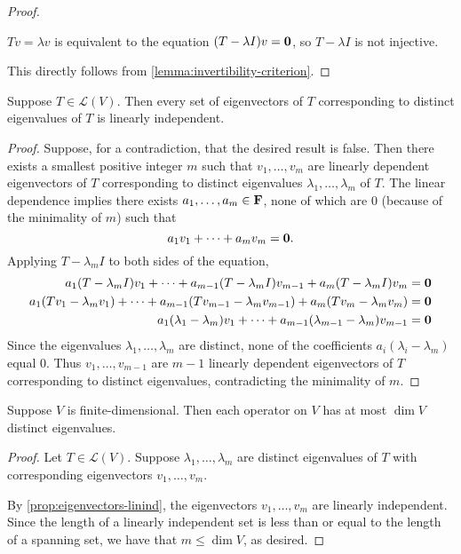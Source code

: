 \begin{proof} \

 $Tv=\lambda v$ is equivalent to the equation $(T-\lambda I)v=\vb{0}$, so $T-\lambda I$ is not injective.

 This directly follows from \ref{lemma:invertibility-criterion}.
\end{proof}

\begin{proposition}\label{prop:eigenvectors-linind}
Suppose $T\in\mathcal{L}(V)$. Then every set of eigenvectors of $T$ corresponding to distinct eigenvalues of $T$ is linearly independent.
\end{proposition}

\begin{proof}
Suppose, for a contradiction, that the desired result is false. Then there exists a smallest positive integer $m$ such that $v_1,\dots,v_m$ are linearly dependent eigenvectors of $T$ corresponding to distinct eigenvalues $\lambda_1,\dots,\lambda_m$ of $T$. The linear dependence implies there exists $a_1,\dots,a_m\in\mathbf F$, none of which are $0$ (because of the minimality of $m$) such that
\[a_1v_1+\cdots+a_mv_m=\vb{0}.\]
Applying $T-\lambda_mI$ to both sides of the equation,
\begin{align*}
a_1(T-\lambda_mI)v_1+\cdots+a_{m-1}(T-\lambda_mI)v_{m-1}+a_m(T-\lambda_mI)v_m&=\vb{0}\\
a_1(Tv_1-\lambda_mv_1)+\cdots+a_{m-1}(Tv_{m-1}-\lambda_mv_{m-1})+a_m(Tv_m-\lambda_mv_m)&=\vb{0}\\
a_1(\lambda_1-\lambda_m)v_1+\cdots+a_{m-1}(\lambda_{m-1}-\lambda_m)v_{m-1}&=\vb{0}
\end{align*}
Since the eigenvalues $\lambda_1,\dots,\lambda_m$ are distinct, none of the coefficients $a_i(\lambda_i-\lambda_m)$ equal $0$. Thus $v_1,\dots,v_{m-1}$ are $m-1$ linearly dependent eigenvectors of $T$ corresponding to distinct eigenvalues, contradicting the minimality of $m$.
\end{proof}

\begin{corollary}
Suppose $V$ is finite-dimensional. Then each operator on $V$ has at most $\dim V$ distinct eigenvalues.
\end{corollary}

\begin{proof}
Let $T\in\mathcal{L}(V)$. Suppose $\lambda_1,\dots,\lambda_m$ are distinct eigenvalues of $T$ with corresponding eigenvectors $v_1,\dots,v_m$.

By \ref{prop:eigenvectors-linind}, the eigenvectors $v_1,\dots,v_m$ are linearly independent. Since the length of a linearly independent set is less than or equal to the length of a spanning set, we have that $m\le\dim V$, as desired.
\end{proof}
\pagebreak

